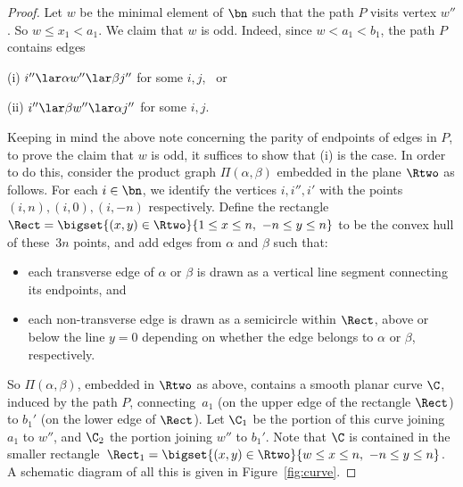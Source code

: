 \begin{proof}
%
Let $w$ be the minimal element of $\bn$ such that the path $P$ visits vertex $w''$.  So $w\leq x_1<a_1$.  We claim that $w$ is odd.  Indeed, since $w<a_1<b_1$, the path $P$ contains edges
\begin{itemize}\begin{multicols}{2}
\item[(i)] $i''\lar\alpha w''\lar\beta j''$ for some $i,j$, \ or 
\item[(ii)] $i''\lar\beta w''\lar\alpha j''$ for some $i,j$.  
\end{multicols}\end{itemize}
Keeping in mind the above note concerning the parity of endpoints of edges in $P$, to prove the claim that $w$ is odd, it suffices to show that (i) is the case.  
%
In order to do this, consider the product graph $\Pi(\alpha,\beta)$ embedded in the plane $\Rtwo$ as follows.  For each $i\in\bn$, we identify the vertices $i,i'',i'$ with the points $(i,n),(i,0),(i,-n)$ respectively.  Define the rectangle $\Rect=\bigset{(x,y)\in\Rtwo}{1\leq x\leq n,\ -n\leq y\leq n}$ to be the convex hull of these~$3n$ points, and add edges from $\alpha$ and $\beta$ such that:
\begin{itemize}
\item each transverse edge of $\alpha$ or $\beta$ is drawn as a vertical line segment connecting its endpoints, and 
\item each non-transverse edge is drawn as a semicircle within $\Rect$, above or below the line $y=0$ depending on whether the edge belongs to $\alpha$ or $\beta$, respectively.
\end{itemize}
So $\Pi(\alpha,\beta)$, embedded in $\Rtwo$ as above, contains a smooth planar curve $\C$, induced by the path $P$, connecting~$a_1$ (on the upper edge of the rectangle $\Rect$) to $b_1'$ (on the lower edge of $\Rect$).  Let $\C_1$ be the portion of this curve joining $a_1$ to $w''$, and $\C_2$ the portion joining $w''$ to $b_1'$.  Note that $\C$ is contained in the smaller rectangle~${\Rect_1=\bigset{(x,y)\in\Rtwo}{w\leq x\leq n,\ -n\leq y\leq n}}$.  A schematic diagram of all this is given in Figure~\ref{fig:curve}.  


\end{proof}
